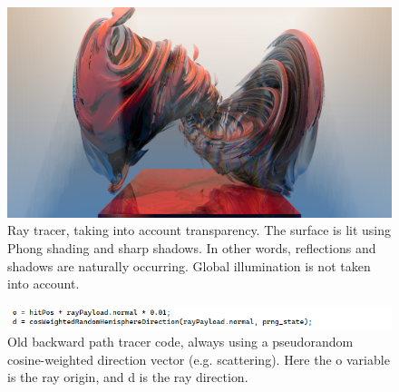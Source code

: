 \documentclass[10pt]{article}
\begin{document}
\begin{figure} 
\centering
  \includegraphics[width = 6 in]{v_rt_reflect.png}
  \caption{ Ray tracer, taking into account transparency.
The surface is lit using Phong shading and sharp shadows.
In other words, reflections and shadows are naturally occurring.
Global illumination is not taken into account.
}
\end{figure}




\begin{figure} 
\centering
  \includegraphics[width = 6 in]{old_code.png}
  \caption{ Old backward path tracer code, always using a pseudorandom cosine-weighted direction vector (e.g. scattering).
Here the o variable is the ray origin, and d is the ray direction.
}
\end{figure}
\end{document}
